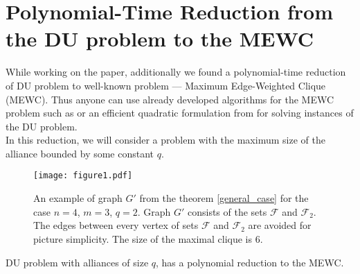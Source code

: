 \documentclass[smallextended]{svjour3}       %
\begin{document}
\section{Polynomial-Time Reduction from the DU problem to the MEWC}
While working on the paper, additionally we found a polynomial-time reduction of DU problem to well-known problem --- Maximum Edge-Weighted Clique (MEWC).
Thus anyone can use already developed algorithms for the MEWC problem such as \cite{san2019new} or an efficient quadratic formulation from \cite{hosseinian2017maximum} for solving instances of the DU problem.\\
In this reduction, we will consider a problem with the maximum size of the alliance bounded by some constant $q$.

\begin{figure}[h!]
\begin{center}
\texttt{[image: figure1.pdf]}
\caption{An example of graph $G'$ from the theorem \ref{general_case} for the case $n=4$, $m=3$, $q=2$.
Graph $G'$ consists of the sets $\mathcal{F}$ and $\mathcal{F}_2$.
The edges between every vertex of sets $\mathcal{F}$ and $\mathcal{F}_2$ are avoided for picture simplicity.
The size of the maximal clique is 6. }
\label{fig:reduction}
\end{center}
\end{figure}

\begin{theorem}
\label{general_case}
    DU problem with alliances of size $q$, has a polynomial reduction to the MEWC.
\end{theorem}
\end{document}
